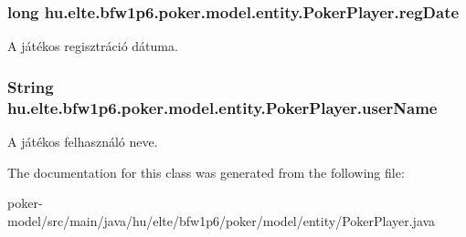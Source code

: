 \subsubsection[{reg\+Date}]{\setlength{\rightskip}{0pt plus 5cm}long hu.\+elte.\+bfw1p6.\+poker.\+model.\+entity.\+Poker\+Player.\+reg\+Date\hspace{0.3cm}{\ttfamily [protected]}}\label{classhu_1_1elte_1_1bfw1p6_1_1poker_1_1model_1_1entity_1_1_poker_player_a28e40f51bb34e7cd89b2c96f6c2dd042}
A játékos regisztráció dátuma. \hypertarget{classhu_1_1elte_1_1bfw1p6_1_1poker_1_1model_1_1entity_1_1_poker_player_a7ce646bef4bf8f58972dc22d6435bead}{}
\subsubsection[{user\+Name}]{\setlength{\rightskip}{0pt plus 5cm}String hu.\+elte.\+bfw1p6.\+poker.\+model.\+entity.\+Poker\+Player.\+user\+Name\hspace{0.3cm}{\ttfamily [protected]}}\label{classhu_1_1elte_1_1bfw1p6_1_1poker_1_1model_1_1entity_1_1_poker_player_a7ce646bef4bf8f58972dc22d6435bead}
A játékos felhasználó neve. 

The documentation for this class was generated from the following file\+:\begin{DoxyCompactItemize}
\item 
poker-\/model/src/main/java/hu/elte/bfw1p6/poker/model/entity/Poker\+Player.\+java\end{DoxyCompactItemize}
